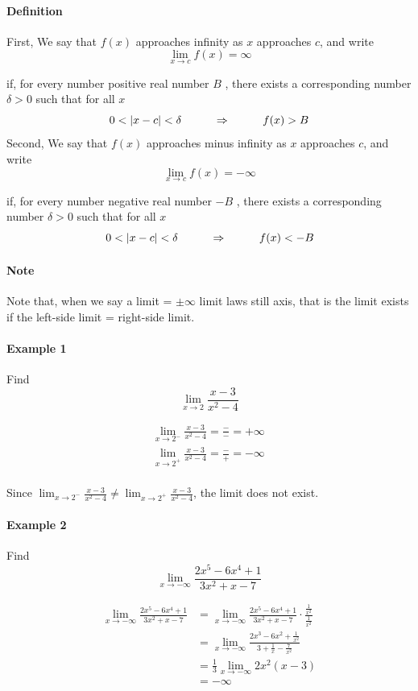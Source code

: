 \documentclass[12pt]{article}
\newcommand\tab[1][1cm]{\hspace*{#1}}
\begin{document}
\paragraph{Definition} First, We say that $f(x)$ approaches infinity as $x$ approaches $c$, and write
\[
    \lim_{x \to c} f(x) = \infty
\]

if, for every number positive real number $B$ , there exists a corresponding number $\delta > 0$ such that for all $x$
\[
    0 < |x - c| < \delta \textrm{\tab} \Rightarrow \textrm{\tab} f(x) > B
\]
Second, We say that $f(x)$ approaches minus infinity as $x$ approaches $c$, and write
\[
    \lim_{x \to c} f(x) = - \infty
\]

if, for every number negative real number $-B$ , there exists a corresponding number $\delta > 0$ such that for all $x$
\[
    0 < |x - c| < \delta \textrm{\tab} \Rightarrow \textrm{\tab} f(x) < -B
\]

\paragraph{Note} Note that, when we say a limit = $\pm \infty$ limit laws still axis, that is the limit exists
if the left-side limit = right-side limit.

\paragraph{Example 1} Find
\[
    \lim_{x \to 2} \frac{x - 3}{x^2 - 4} 
\]

\begin{align*} 
    \lim_{x \to 2^{-}} \frac{x - 3}{x^2 - 4} = \frac{ - }{ - } = +\infty\, \\
    \lim_{x \to 2^{+}} \frac{x - 3}{x^2 - 4} = \frac{ - }{ + } = -\infty\, \\
\end{align*}

Since $\lim_{x \to 2^{-}} \frac{x - 3}{x^2 - 4} \neq \lim_{x \to 2^{+}} \frac{x - 3}{x^2 - 4}$, the limit does not exist.

\paragraph{Example 2} Find
\[
    \lim_{x \to -\infty} \frac{2x^5 - 6x^4 + 1}{3x^2 + x - 7} 
\]

\begin{align*} 
    \lim_{x \to -\infty} \frac{2x^5 - 6x^4 + 1}{3x^2 + x - 7} &=   \lim_{x \to -\infty} \frac{2x^5 - 6x^4 + 1}{3x^2 + x - 7} \cdot \frac{{\frac{1}{x^2}}}{\frac{1}{x^2}} \\
    &=  \lim_{x \to -\infty} \frac{2x^3 - 6x^2 + \frac{1}{x^2}}{3 + \frac{1}{x} - \frac{7}{x^2}} \\
    &= \frac{1}{3} \lim_{x \to -\infty} 2x^2(x - 3) \\
    &= -\infty
\end{align*}
\end{document}
